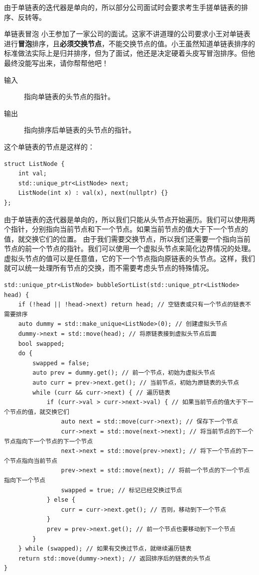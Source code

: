 由于单链表的迭代器是单向的，所以部分公司面试时会要求考生手搓单链表的排序、反转等。
\begin{example}{单链表冒泡}{}
小王参加了一家公司的面试。这家不讲道理的公司要求小王对单链表进行\textbf{冒泡}排序，且\textbf{必须交换节点}，不能交换节点的值。小王虽然知道单链表排序的标准做法实际上是归并排序，但为了面试，他还是决定硬着头皮写冒泡排序。但他最终没能写出来，请你帮帮他吧！
\begin{description}
    \item[输入] 指向单链表的头节点的指针。
    \item[输出] 指向排序后单链表的头节点的指针。
\end{description}
这个单链表的节点是这样的：
\begin{verbatim}
struct ListNode {
    int val;
    std::unique_ptr<ListNode> next;
    ListNode(int x) : val(x), next(nullptr) {}
};
\end{verbatim}
\tcblower
    由于单链表的迭代器是单向的，所以我们只能从头节点开始遍历。我们可以使用两个指针，分别指向当前节点和下一个节点。如果当前节点的值大于下一个节点的值，就交换它们的位置。
    由于我们需要交换节点，所以我们还需要一个指向当前节点的前一个节点的指针。我们可以使用一个虚拟头节点来简化边界情况的处理。虚拟头节点的值可以是任意值，它的下一个节点指向原链表的头节点。这样，我们就可以统一处理所有节点的交换，而不需要考虑头节点的特殊情况。
    \begin{verbatim}
std::unique_ptr<ListNode> bubbleSortList(std::unique_ptr<ListNode> head) {
    if (!head || !head->next) return head; // 空链表或只有一个节点的链表不需要排序
    auto dummy = std::make_unique<ListNode>(0); // 创建虚拟头节点
    dummy->next = std::move(head); // 将原链表接到虚拟头节点后面
    bool swapped;
    do {
        swapped = false;
        auto prev = dummy.get(); // 前一个节点，初始为虚拟头节点
        auto curr = prev->next.get(); // 当前节点，初始为原链表的头节点
        while (curr && curr->next) { // 遍历链表
            if (curr->val > curr->next->val) { // 如果当前节点的值大于下一个节点的值，就交换它们
                auto next = std::move(curr->next); // 保存下一个节点
                curr->next = std::move(next->next); // 将当前节点的下一个节点指向下一个节点的下一个节点
                next->next = std::move(prev->next); // 将下一个节点的下一个节点指向当前节点
                prev->next = std::move(next); // 将前一个节点的下一个节点指向下一个节点
                swapped = true; // 标记已经交换过节点
            } else {
                curr = curr->next.get(); // 否则，移动到下一个节点
            }
            prev = prev->next.get(); // 前一个节点也要移动到下一个节点
        }
    } while (swapped); // 如果有交换过节点，就继续遍历链表
    return std::move(dummy->next); // 返回排序后的链表的头节点
}
    \end{verbatim}


\end{example}
